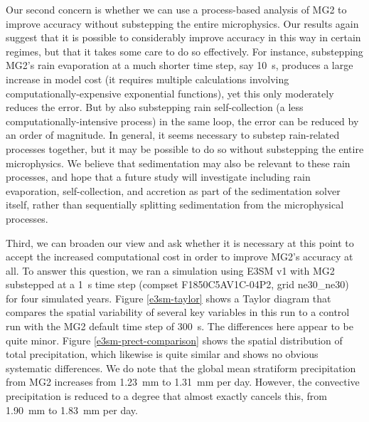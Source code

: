 \documentclass [11pt, proquest] {uwthesis}[2020/02/24]
\begin{document}
Our second concern is whether we can use a process-based analysis of MG2 to improve accuracy without substepping the entire microphysics. Our results again suggest that it is possible to considerably improve accuracy in this way in certain regimes, but that it takes some care to do so effectively. For instance, substepping MG2's rain evaporation at a much shorter time step, say \SI{10}{\second}, produces a large increase in model cost (it requires multiple calculations involving computationally-expensive exponential functions), yet this only moderately reduces the error. But by also substepping rain self-collection (a less computationally-intensive process) in the same loop, the error can be reduced by an order of magnitude. In general, it seems necessary to substep rain-related processes together, but it may be possible to do so without substepping the entire microphysics. We believe that sedimentation may also be relevant to these rain processes, and hope that a future study will investigate including rain evaporation, self-collection, and accretion as part of the sedimentation solver itself, rather than sequentially splitting sedimentation from the microphysical processes.

Third, we can broaden our view and ask whether it is necessary at this point to accept the increased computational cost in order to improve MG2's accuracy at all. To answer this question, we ran a simulation using E3SM v1 with MG2 substepped at a \SI{1}{\second} time step (compset F1850C5AV1C-04P2, grid ne30\_ne30) for four simulated years. Figure \ref{e3sm-taylor} shows a Taylor diagram \parencite{Taylor2001} that compares the spatial variability of several key variables in this run to a control run with the MG2 default time step of \SI{300}{\second}. The differences here appear to be quite minor. Figure \ref{e3sm-prect-comparison} shows the spatial distribution of total precipitation, which likewise is quite similar and shows no obvious systematic differences. We do note that the global mean stratiform precipitation from MG2 increases from \SI{1.23}{\milli\meter} to \SI{1.31}{\milli\meter} per day. However, the convective precipitation is reduced to a degree that almost exactly cancels this, from \SI{1.90}{\milli\meter} to \SI{1.83}{\milli\meter} per day.
\end{document}
